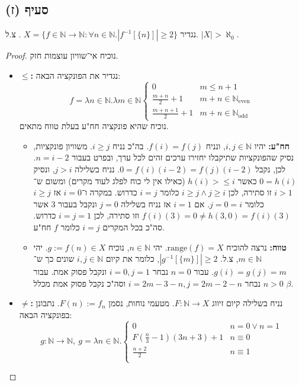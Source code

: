 \documentclass[]{article}
\newcommand\N     {\mathbb{N}}
\newcommand\Neven {\N_{\mathrm{even}}}
\newcommand\Nodd  {\N_{\mathrm{odd }}}
\newcommand\range {\text{range}}
\newcommand\az    {\aleph_0}
\begin{document}
	\subsection*{סעיף (ז)}
	נגדיר
	$ X = \{f \in \N \to \N \colon \forall n \in \N. |f^{-1}[\{n\}]| \ge 2\} $
	. צ.ל. $ |X| > \az $. 
	\begin{proof}
		נוכיח אי־שוויון עוצמות חזק. 
		\begin{itemize}
			\item $ \bm{\le} $\textbf{: }נגדיר את הפונקציה הבאה: 
			\[ f = \lambda n \in \N. \lambda m \in \N \begin{cases}
				0 & m \le n + 1 \\
				\tfrac{m + n}{2} + 1 & m + n \in \Neven \\
				\tfrac{m + n + 1}{2} + 1 & m + n \in \Nodd
			\end{cases} \]
		נוכיח שהיא פונקציה חח"ע בעלת טווח מתאים. 
			\begin{itemize}
				\item \textbf{חח"ע: }יהיו $ i, j \in \N $, ונניח $ f(i) = f(j) $. בה"כ נניח $ i \ge j $. משוויון פונקציות, נסיק שהפונקציות שתיקבלו יחזירו ערכים זהים לכל ערך, ובפרט בעבור $ n = i - 2 $. לכן, נקבל $ 0 = f(i)(i - 2) = f(j)(i - 2) $. נניח בשלילה $ j > i $, ונסיק $ 0 = h(i) $ כאשר $ h(i) > \le i $ (כאילו אין לי כוח לפלג לעוד מקרים) ומשום ש־$ i > 1 $ זו סתירה, לכן $ i \ge j \land j \ge i $ כלומר $ i = j $ כדרוש. במקרה ו־$ i = 0 $ אז $ i \ge j $ כלומר $ j = 0 = i $. אם $ i = 1 $ אז נניח בשלילה $ j = 0 $ ונקבל בעבור $ 3 $ אשר $ f(i)(3) = 0 \neq h(3, 0) = f(i)(3) $ וזו סתירה, לכן $ i = j = 1 $ כדרוש. סה"כ בכל המקרים $ i = j $ כלומר $ f $ חח"ע. 
				\item \textbf{טווח: }נרצה להוכיח $ \range(f) = X $. יהי $ n \in \N $, נוכיח $ g := f(n) \in X $. יהי $ m \in \N $, צ.ל. $ |g^{-1}[\{m\}]| \ge 2 $, כלומר את קיום $ i, j \in \N $ שונים כך ש־$ g(i) = g(j) = m $. עבור $ n = 0 $ נבחר $ i = 0, j = 1 $ ונקבל פסוק אמת. עבור $ n > 0 $ נבחר $ i = 2m - 3 - n, j = 2m - 2 - n $ וסה"כ נקבל פסוק אמת מכלל $ \beta $. 
			\end{itemize}
			\item $ \bm{\neq} $\textbf{: }נניח בשלילה קיום זיווג $ F \colon \N \to X $. מטעמי נוחות, נסמן $ F(n) := f_n $. נתבונן בפונקציה הבאה: 
			\[ g \colon \N \to \N, \ g = \lambda n \in \N. \begin{cases}
				0 &n = 0 \lor n = 1 \\
				F(\tfrac{n}{3} - 1)(3n + 3) + 1 & n \equiv 0 \\
				\tfrac{n + 2}{2} & n \equiv 1 \\

\end{cases}\]
\end{itemize}
\end{proof}
\end{document}
